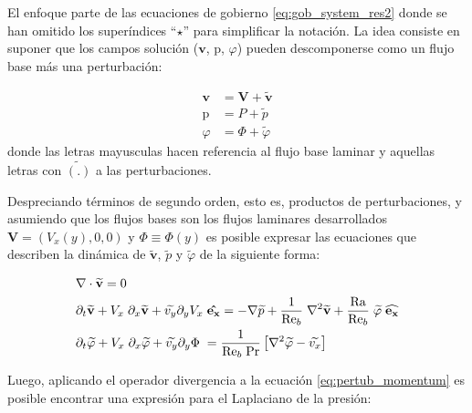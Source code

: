 El enfoque parte de las ecuaciones de gobierno \ref{eq:gob_system_res2} donde se han omitido los superíndices ``${\star}$'' para simplificar la notación. La idea consiste en suponer que los campos solución ($\mathbf{v}$, $\text{p}$, $\varphi$) pueden descomponerse como un flujo base más una perturbación:

\begin{align}
\mathbf{v} &= \mathbf{V} + \widetilde{\mathbf{v}} \\
\text{p} &= P + \widetilde{p} \\
\varphi &= \Phi + \widetilde{\varphi}
\end{align}  
donde las letras mayusculas hacen referencia al flujo base laminar y aquellas letras con $\widetilde{(\text{.})}$ a las perturbaciones. 

Despreciando términos de segundo orden, esto es, productos de perturbaciones, y asumiendo que los flujos bases son los flujos laminares desarrollados $\mathbf{V} = (V_x(y),0,0)$ y $\Phi \equiv \Phi(y)$ es posible expresar las ecuaciones que describen la dinámica de $\widetilde{\mathbf{v}}$, $\widetilde{p}$ y $\widetilde{\varphi}$ de la siguiente forma: 

\begin{align}
&\nabla \cdot \mathbf{\widetilde{v}} = 0
\label{eq:pertub_continuity} \\
&\partial_t \mathbf{\widetilde{v}} + V_x \hspace{1mm} \partial_x \mathbf{\widetilde{v}} + {\widetilde{v_y}} \partial_y V_x \hspace{1mm} \mathbf{\hat{e_x}} = - \nabla \widetilde{p} + \frac{1}{\text{Re}_b} \hspace{1mm} \nabla^2 \mathbf{\widetilde{v}} + \frac{\text{Ra}}{\text{Re}_b} \hspace{1mm} \widetilde{\varphi} \hspace{1mm}  \mathbf{\widehat{e_x}} 
\label{eq:pertub_momentum} \\
&\partial_t {\widetilde{\varphi}} + V_x \hspace{1mm} \partial_x {\widetilde{\varphi}} + {\widetilde{v_y}} \partial_y \Phi \hspace{1mm} = \frac{1}{\text{Re}_b \hspace{1mm} \text{Pr}} \left[ \nabla^2 \widetilde{\varphi} - \widetilde{v_x} \right]
\label{eq:pertub_energy} 
\end{align} 

Luego, aplicando el operador divergencia a la ecuación \ref{eq:pertub_momentum} es posible encontrar una expresión para el Laplaciano de la presión:

